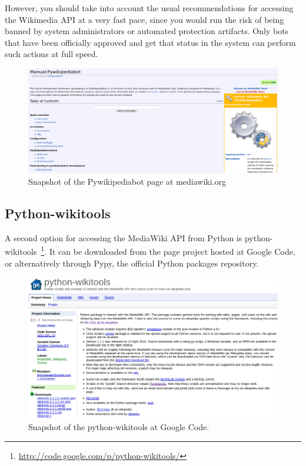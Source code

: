 However, you should take into account the usual recommendations for accessing
the Wikimedia API at a very fast pace, since you would run the risk of being banned
by system administrators or automated protection artifacts. Only bots that 
have been officially approved and get that status in the system can perform 
such actions at full speed.

\begin{figure}[h]
  \centering
    \includegraphics[width=\textwidth]{figs/pywikipediabot}
  \caption{Snapshot of the Pywikipediabot page at mediawiki.org}
\end{figure}

\subsection{Python-wikitools}
A second option for accessing the MediaWiki API from Python is 
python-wikitools~\footnote{\url{http://code.google.com/p/python-wikitools/}}. It
can be downloaded from the page project hosted at Google Code, or alternatively
through Pypy, the official Python packages repository.

\begin{figure}[h]
  \centering
    \includegraphics[width=\textwidth]{figs/python-wikitools}
  \caption{Snapshot of the python-wikitools at Google Code.}
\end{figure}

